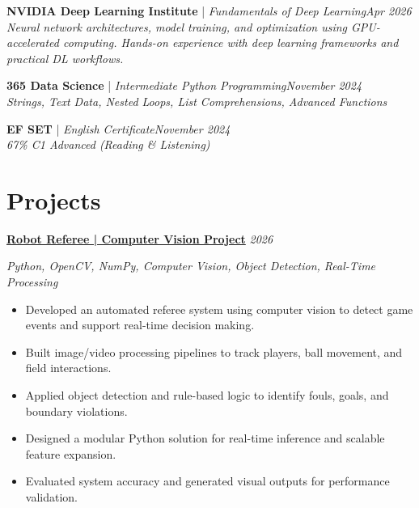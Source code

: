 \documentclass[a4paper,11pt]{article}
\newcommand{\cvcert}[4]{%
  \textbf{#1} | \textit{#2}\hfill \textit{#4} \\
  \textit{#3}
  \vspace{2pt}
}
\newcommand{\cvproject}[2]{%
  \textbf{#1} \hfill \textit{#2}
  \vspace{2pt}
}
\begin{document}

\cvcert{NVIDIA Deep Learning Institute}{Fundamentals of Deep Learning}{
  Neural network architectures, model training, and optimization using GPU-accelerated computing. \newline
  Hands-on experience with deep learning frameworks and practical DL workflows.
}{Apr 2026}

\vspace{4pt}

\cvcert{365 Data Science}{Intermediate Python Programming}{Strings, Text Data, Nested Loops, List Comprehensions, Advanced Functions}{November 2024}

\vspace{4pt}

\cvcert{EF SET}{English Certificate}{67\% C1 Advanced (Reading \& Listening)}{November 2024}

\section{Projects}

\cvproject{\href{https://github.com/Khaled100233/Robot-Referee}{Robot Referee | Computer Vision Project}}{2026}
\newline \textit{Python, OpenCV, NumPy, Computer Vision, Object Detection, Real-Time Processing}
\begin{itemize}[leftmargin=1.5em, topsep=2pt, itemsep=-5pt]
  \item Developed an automated referee system using computer vision to detect game events and support real-time decision making.
  \item Built image/video processing pipelines to track players, ball movement, and field interactions.
  \item Applied object detection and rule-based logic to identify fouls, goals, and boundary violations.
  \item Designed a modular Python solution for real-time inference and scalable feature expansion.
  \item Evaluated system accuracy and generated visual outputs for performance validation.
\end{itemize}

\vspace{6pt}
\end{document}
